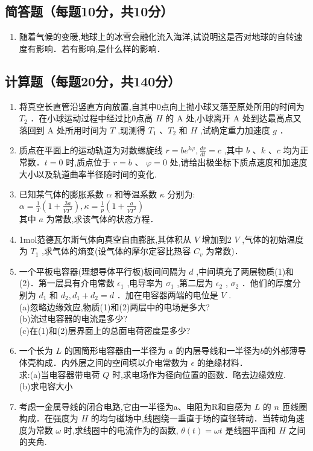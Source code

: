 
\subsection{简答题（每题10分，共10分）}
\begin{enumerate}
\item 随着气候的变暖,地球上的冰雪会融化流入海洋,试说明这是否对地球的自转速度有影响．若有影响,是什么样的影响．
\end{enumerate}
\subsection{计算题（每题20分，共140分）}
\begin{enumerate}
\item 将真空长直管沿竖直方向放置,自其中0点向上抛小球又落至原处所用的时间为 $T_2$ ．在小球运动过程中经过比0点高 $H$ 的 $\mathrm A$ 处,小球离开 $\mathrm A$ 处到达最高点又落回到 $\mathrm A$ 处所用时间为 $T$ ,现测得 $T_1$ 、$T_2$ 和 $H$ ,试确定重力加速度 $g$ ．
\item 质点在平面上的运动轨道为对数螺旋线 $r=be^{k\varphi},\frac{dr}{dt}=c$ ,其中 $b$ 、$k$ 、$c$ 均为正常数．$t=0$ 时,质点位于 $r=b$ 、 $\varphi=0$ 处,请给出极坐标下质点速度和加速度大小以及轨道曲率半径随时间的变化.
\item 已知某气体的膨胀系数 $\alpha$ 和等温系数 $\kappa$ 分别为:\\
 $\alpha=\frac{1}{T}(1+\frac{3a}{VT^2}),\kappa=\frac{1}{p}(1+\frac{a}{VT^2})$ \\
其中 $a$ 为常数,求该气体的状态方程．

\item 1mol范德瓦尔斯气体向真空自由膨胀,其体积从 $V$ 增加到2 $V$ ,气体的初始温度为 $T_1$ ,求气体的熵变(设气体的摩尔定容比热容 $C_v$ 为常数)．
\item 一个平板电容器(理想导体平行板)板间间隔为 $d$ ,中间填充了两层物质(1)和(2)．第一层具有介电常数 $\epsilon_1$ ,电导率为 $\sigma_1$ ,第二层为 $\epsilon_2$ , $\sigma_2$ ．他们的厚度分别为 $d_1$ 和 $d_2,d_1+d_2=d$ ．加在电容器两端的电位是 $V$ .\\
(a)忽略边缘效应,物质(1)和(2)两层中的电场是多大?\\
(b)流过电容器的电流是多少?\\
(c)在(1)和(2)层界面上的总面电荷密度是多少?\\
\item 一个长为 $L$ 的圆筒形电容器由一半径为 $a$ 的内层导线和一半径为$b$的外部薄导体壳构成．内外层之间的空间填以介电常数为 $\epsilon$ 的绝缘材料．\\
求:(a)当电容器带电荷 $Q$ 时,求电场作为径向位置的函数．略去边缘效应.\\
(b)求电容大小
\item 考虑一金属导线的闭合电路,它由一半径为a、电阻为R和自感为 $L$ 的 $n$ 匝线圈构成．在强度为 $H$ 的均匀磁场中,线圈绕一垂直于场的直径转动．当转动角速度为常数 $\omega$ 时,求线圈中的电流作为的函数, $\theta (t)=\omega t$ 是线圈平面和 $H$ 之间的夹角.

\end{enumerate}